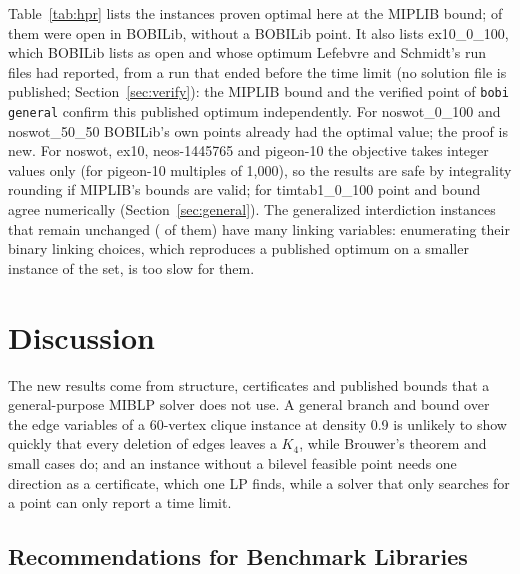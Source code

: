 \documentclass[]{spie}  %
\theoremstyle{plain}
\newcommand{\code}[1]{\texttt{#1}}
\newcommand{\inst}[1]{\mbox{#1}}             %
\begin{document}
Table~\ref{tab:hpr} lists the \NumHprOptimal{} instances proven optimal here at the MIPLIB bound;
\NumHprOpen{} of them were open in BOBILib, without a BOBILib point. It also lists
\inst{ex10\_0\_100}, which BOBILib lists as open and whose optimum \ExTenOptimum{} Lefebvre and
Schmidt's run files had reported, from a run that ended before the time limit (no solution file is
published; Section~\ref{sec:verify}): the MIPLIB bound and the verified point of \code{bobi general}
confirm this published optimum independently. For \inst{noswot\_0\_100} and \inst{noswot\_50\_50} BOBILib's
own points already had the optimal value; the proof is new. For \inst{noswot}, \inst{ex10},
\inst{neos-1445765} and \inst{pigeon-10} the objective takes integer values only (for
\inst{pigeon-10} multiples of 1,000), so the results are safe by integrality rounding if MIPLIB's
bounds are valid; for \inst{timtab1\_0\_100} point and bound agree numerically
(Section~\ref{sec:general}). The generalized interdiction instances
that remain unchanged (\NumGeneralizedUnchanged{} of them) have many linking variables:
enumerating their binary linking choices, which reproduces a published optimum on a smaller
instance of the set, is too slow for them.

\section{Discussion}\label{sec:discussion}

The new results come from structure, certificates and published bounds that a general-purpose
MIBLP solver does not use. A general branch and bound over the \CliqueMSixtyNine{} edge variables
of a 60-vertex clique instance at density 0.9 is unlikely to show quickly that every deletion of
\CliqueKSixtyNine{} edges leaves a $K_4$, while Brouwer's theorem and \NumCliquePartCases{} small
cases do; and an instance without a bilevel feasible point needs one direction as a certificate,
which one LP finds,\cite{fischetti2018intersection} while a solver that only searches for a point
can only report a time limit.

\subsection{Recommendations for Benchmark Libraries}
\end{document}

